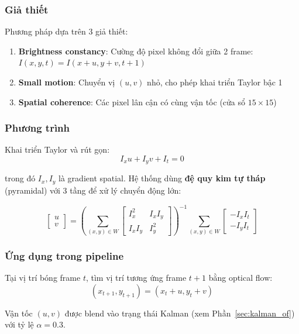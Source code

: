 \documentclass[12pt,a4paper]{article}
\begin{document}
\subsubsection{Giả thiết}
Phương pháp dựa trên 3 giả thiết:
\begin{enumerate}[noitemsep]
    \item \textbf{Brightness constancy}: Cường độ pixel không đổi giữa 2 frame: $I(x,y,t) = I(x+u, y+v, t+1)$
    \item \textbf{Small motion}: Chuyển vị $(u, v)$ nhỏ, cho phép khai triển Taylor bậc 1
    \item \textbf{Spatial coherence}: Các pixel lân cận có cùng vận tốc (cửa sổ $15 \times 15$)
\end{enumerate}

\subsubsection{Phương trình}
Khai triển Taylor và rút gọn:
\begin{equation}
I_x u + I_y v + I_t = 0
\end{equation}

trong đó $I_x, I_y$ là gradient spatial. Hệ thống dùng \textbf{đệ quy kim tự tháp} (pyramidal) với 3 tầng để xử lý chuyển động lớn:

\begin{equation}
\begin{bmatrix} u \\ v \end{bmatrix} = 
\left(\sum_{(x,y) \in W} \begin{bmatrix} I_x^2 & I_x I_y \\ I_x I_y & I_y^2 \end{bmatrix}\right)^{-1}
\sum_{(x,y) \in W} \begin{bmatrix} -I_x I_t \\ -I_y I_t \end{bmatrix}
\end{equation}

\subsubsection{Ứng dụng trong pipeline}
Tại vị trí bóng frame $t$, tìm vị trí tương ứng frame $t+1$ bằng optical flow:
\begin{equation}
(x_{t+1}, y_{t+1}) = (x_t + u, y_t + v)
\end{equation}

Vận tốc $(u, v)$ được blend vào trạng thái Kalman (xem Phần~\ref{sec:kalman_of}) với tỷ lệ $\alpha = 0.3$.
\end{document}
